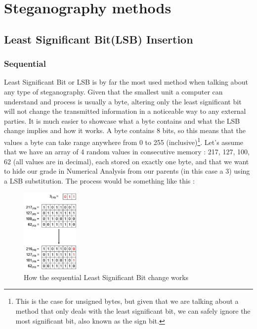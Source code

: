 
\chapter{Steganography methods}


\section{Least Significant Bit(LSB) Insertion}
\begin{multicols*}{2}
\subsection{Sequential}
\setlength\columnsep{20pt}

Least Significant Bit or LSB is by far the most used method when talking about any type of steganography. Given that the smallest unit a computer can understand and process is usually a byte, altering only the least significant bit will not change the transmitted information in a noticeable way to any external parties. It is much easier to showcase what a byte contains and what the LSB change implies and how it works. A byte contains 8 bits, so this means that the values a byte can take range anywhere from 0 to 255 (inclusive)\footnote{This is the case for unsigned bytes, but given that we are talking about a method that only deals with the least significant bit, we can safely ignore the most significant bit, also known as the sign bit.}. Let's assume that we have an array of 4 random values in consecutive memory : 217, 127, 100, 62 (all values are in decimal), each stored on exactly one byte, and that we want to hide our grade in Numerical Analysis from our parents (in this case a 3) using a LSB substitution. The process would be something like this :

\begin{figure}[H]
    \centering
    \includegraphics[width=2.8cm,keepaspectratio]{pics/how_lsb_works}
    \caption{How the sequential Least Significant Bit change works}
    \label{LSB}
\end{figure}


\end{multicols*}
